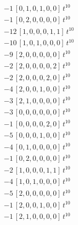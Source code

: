 \begin{align*}
-1\,[0,1,0,1,0,0]\,t^{10} \\
-1\,[0,2,0,0,0,0]\,t^{10} \\
-12\,[1,0,0,0,1,1]\,t^{10} \\
-10\,[1,0,1,0,0,0]\,t^{10} \\
-9\,[2,0,0,0,0,0]\,t^{10} \\
-2\,[2,0,0,0,0,2]\,t^{10} \\
-2\,[2,0,0,0,2,0]\,t^{10} \\
-4\,[2,0,0,1,0,0]\,t^{10} \\
-3\,[2,1,0,0,0,0]\,t^{10} \\
-3\,[0,0,0,0,0,0]\,t^{10} \\
-1\,[0,0,0,0,2,0]\,t^{10} \\
-5\,[0,0,0,1,0,0]\,t^{10} \\
-4\,[0,1,0,0,0,0]\,t^{10} \\
-1\,[0,2,0,0,0,0]\,t^{10} \\
-2\,[1,0,0,0,1,1]\,t^{10} \\
-4\,[1,0,1,0,0,0]\,t^{10} \\
-5\,[2,0,0,0,0,0]\,t^{10} \\
-1\,[2,0,0,1,0,0]\,t^{10} \\
-1\,[2,1,0,0,0,0]\,t^{10}
\end{align*}
